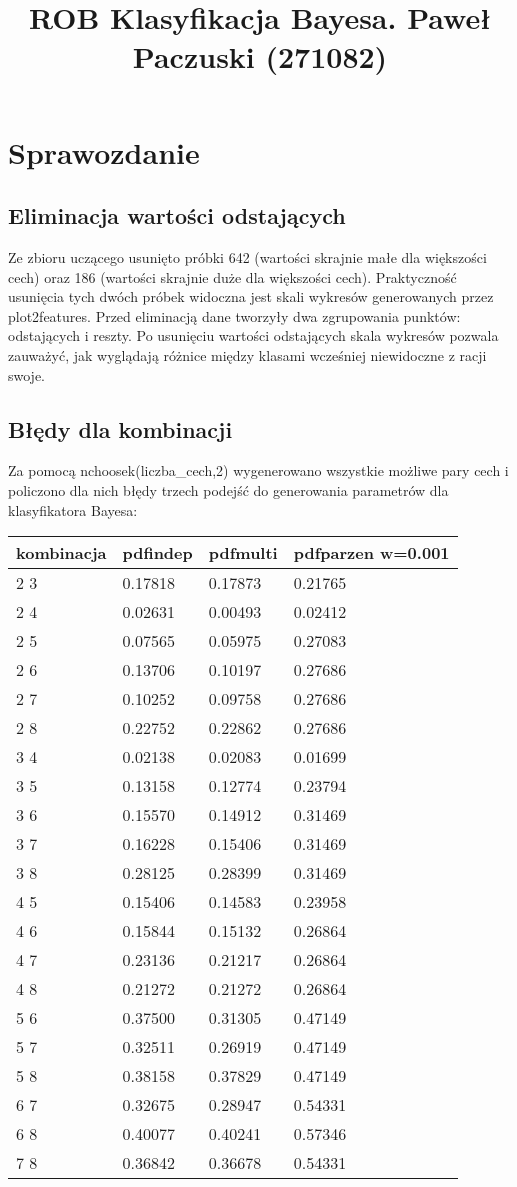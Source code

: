 \documentclass[11pt]{article}
\title{ROB Klasyfikacja Bayesa. Paweł Paczuski (271082)}
\begin{document}
    
    
    \maketitle
    
    

    
    \section{Sprawozdanie}\label{rob-klasyfikacja-bayesa-paweux142-paczuski-271028}

    \subsection{Eliminacja wartości
odstających}\label{eliminacja-wartoux15bci-odstajux105cych}

Ze zbioru uczącego usunięto próbki 642 (wartości skrajnie małe dla
większości cech) oraz 186 (wartości skrajnie duże dla większości cech).
Praktyczność usunięcia tych dwóch próbek widoczna jest skali wykresów
generowanych przez plot2features. Przed eliminacją dane tworzyły dwa
zgrupowania punktów: odstających i reszty. Po usunięciu wartości
odstających skala wykresów pozwala zauważyć, jak wyglądają różnice
między klasami wcześniej niewidoczne z racji swoje.

\subsection{Błędy dla kombinacji}\label{bux142ux119dy-dla-kombinacji}

Za pomocą nchoosek(liczba\_cech,2) wygenerowano wszystkie możliwe pary
cech i policzono dla nich błędy trzech podejść do generowania parametrów
dla klasyfikatora Bayesa:

\begin{longtable}[]{@{}llll@{}}
\toprule
kombinacja & pdfindep & pdfmulti & pdfparzen w=0.001\tabularnewline
\midrule
\endhead
2 3 & 0.17818 & 0.17873 & 0.21765\tabularnewline
2 4 & 0.02631 & 0.00493 & 0.02412\tabularnewline
2 5 & 0.07565 & 0.05975 & 0.27083\tabularnewline
2 6 & 0.13706 & 0.10197 & 0.27686\tabularnewline
2 7 & 0.10252 & 0.09758 & 0.27686\tabularnewline
2 8 & 0.22752 & 0.22862 & 0.27686\tabularnewline
3 4 & 0.02138 & 0.02083 & 0.01699\tabularnewline
3 5 & 0.13158 & 0.12774 & 0.23794\tabularnewline
3 6 & 0.15570 & 0.14912 & 0.31469\tabularnewline
3 7 & 0.16228 & 0.15406 & 0.31469\tabularnewline
3 8 & 0.28125 & 0.28399 & 0.31469\tabularnewline
4 5 & 0.15406 & 0.14583 & 0.23958\tabularnewline
4 6 & 0.15844 & 0.15132 & 0.26864\tabularnewline
4 7 & 0.23136 & 0.21217 & 0.26864\tabularnewline
4 8 & 0.21272 & 0.21272 & 0.26864\tabularnewline
5 6 & 0.37500 & 0.31305 & 0.47149\tabularnewline
5 7 & 0.32511 & 0.26919 & 0.47149\tabularnewline
5 8 & 0.38158 & 0.37829 & 0.47149\tabularnewline
6 7 & 0.32675 & 0.28947 & 0.54331\tabularnewline
6 8 & 0.40077 & 0.40241 & 0.57346\tabularnewline
7 8 & 0.36842 & 0.36678 & 0.54331\tabularnewline
\bottomrule
\end{longtable}
\end{document}
